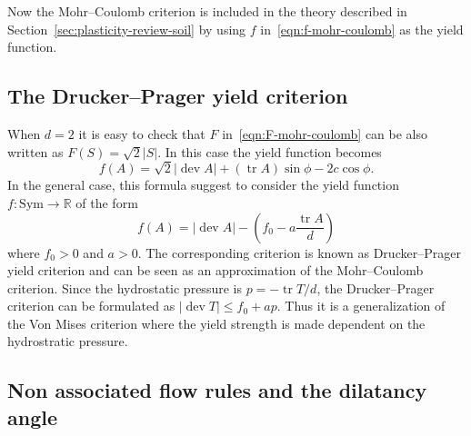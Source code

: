 \documentclass[a4paper,10pt,oneside]{amsbook}
\numberwithin{section}{chapter}
\numberwithin{equation}{chapter}
\theoremstyle{definition}
\DeclareMathOperator{\dev}{dev}
\DeclareMathOperator{\tr}{tr}
\begin{document}
Now the Mohr--Coulomb criterion is included in the theory described in Section~\ref{sec:plasticity-review-soil} by using $f$ in~\eqref{eqn:f-mohr-coulomb} as the yield function.

\subsection{The Drucker--Prager yield criterion}

When $d=2$ it is easy to check that $F$ in~\eqref{eqn:F-mohr-coulomb} can be also written as $F(S)=\sqrt{2}|S|$. In this case the yield function becomes
\begin{equation}
\label{eqn:f-mohr-coulomb-2d}
f(A)=\sqrt{2}|\dev A|+(\tr A)\sin\phi-2c\cos\phi.
\end{equation}
In the general case, this formula suggest to consider the yield function $f\colon\text{Sym}\to\mathbb{R}$ of the form
\begin{equation}
\label{eqn:f}
f(A)=|\dev A|-\left(f_0-a\frac{\tr A}{d}\right)
\end{equation}
where $f_0>0$ and $a>0$. The corresponding criterion is known as Drucker--Prager yield criterion and can be seen as an approximation of the Mohr--Coulomb criterion. Since the hydrostatic pressure is $p=-\tr T/d$, the Drucker--Prager criterion can be formulated as $|\dev T|\le f_0+ap$. Thus it is a generalization of the Von Mises criterion where the yield strength is made dependent on the hydrostratic pressure.

\subsection{Non associated flow rules and the dilatancy angle}
\end{document}
